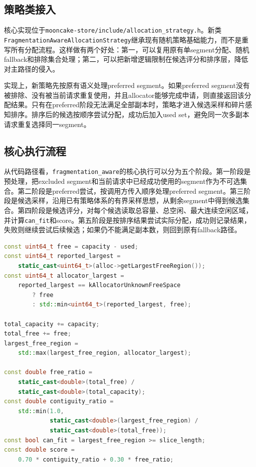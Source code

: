 \documentclass[UTF8,zihao=-4,a4paper]{ctexart}
\newcommand{\artifact}[1]{\texttt{#1}}
\newcommand{\strategy}{\texttt{fragmentation\_aware}}
\begin{document}
\subsection{策略类接入}

核心实现位于\artifact{mooncake-store/include/allocation\_strategy.h}。新类\artifact{FragmentationAwareAllocationStrategy}继承现有随机策略基础能力，而不是重写所有分配流程。这样做有两个好处：第一，可以复用原有单segment分配、随机fallback和排除集合处理；第二，可以把新增逻辑限制在候选评分和排序层，降低对主路径的侵入。

实现上，新策略先按原有语义处理preferred segment。如果preferred segment没有被排除、没有被当前请求重复使用，并且allocator能够完成申请，则直接返回该分配结果。只有在preferred阶段无法满足全部副本时，策略才进入候选采样和碎片感知排序。排序后的候选按顺序尝试分配，成功后加入used set，避免同一次多副本请求重复选择同一segment。

\subsection{核心执行流程}

从代码路径看，\strategy{}的核心执行可以分为五个阶段。第一阶段是预处理，把excluded segment和当前请求中已经成功使用的segment作为不可选集合。第二阶段是preferred尝试，按调用方传入顺序处理preferred segment。第三阶段是候选采样，沿用已有策略体系的有界采样思想，从剩余segment中得到候选集合。第四阶段是候选评分，对每个候选读取总容量、总空闲、最大连续空闲区域，并计算\artifact{can\_fit}和score。第五阶段是按排序结果尝试实际分配，成功则记录结果，失败则继续尝试后续候选；如果仍不能满足副本数，则回到原有fallback路径。

\begin{lstlisting}[language=C++,caption={候选碎片元数据与请求相关评分的实际实现}]
const uint64_t free = capacity - used;
const uint64_t reported_largest =
    static_cast<uint64_t>(alloc->getLargestFreeRegion());
const uint64_t allocator_largest =
    reported_largest == kAllocatorUnknownFreeSpace
        ? free
        : std::min<uint64_t>(reported_largest, free);

total_capacity += capacity;
total_free += free;
largest_free_region =
    std::max(largest_free_region, allocator_largest);

const double free_ratio =
    static_cast<double>(total_free) /
    static_cast<double>(total_capacity);
const double contiguity_ratio =
    std::min(1.0,
             static_cast<double>(largest_free_region) /
             static_cast<double>(total_free));
const bool can_fit = largest_free_region >= slice_length;
const double score =
    0.70 * contiguity_ratio + 0.30 * free_ratio;
\end{lstlisting}
\end{document}
